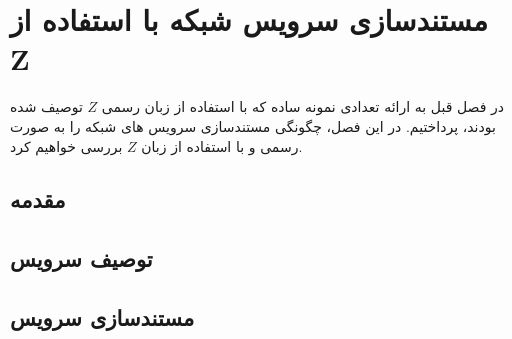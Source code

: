 \chapter{ مستندسازی سرویس شبکه با استفاده از Z}\label{chapter5}

در فصل قبل به ارائه تعدادی نمونه ساده که با استفاده از زبان رسمی $Z$ توصیف شده بودند، پرداختیم. در این فصل، چگونگی مستندسازی سرویس های شبکه را به صورت رسمی و با استفاده از زبان $Z$ بررسی خواهیم کرد.

\section{مقدمه}



\section{توصیف سرویس}




\section{مستندسازی سرویس}
